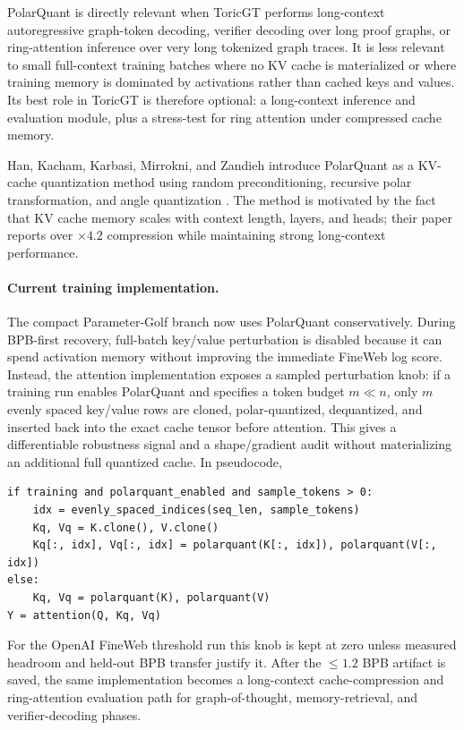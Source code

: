 \documentclass[11pt]{article}
\theoremstyle{definition}
\theoremstyle{plain}
\theoremstyle{remark}
\numberwithin{equation}{section}
\begin{document}
PolarQuant is directly relevant when ToricGT performs long-context autoregressive graph-token decoding, verifier decoding over long proof graphs, or ring-attention inference over very long tokenized graph traces.  It is less relevant to small full-context training batches where no KV cache is materialized or where training memory is dominated by activations rather than cached keys and values.  Its best role in ToricGT is therefore optional: a long-context inference and evaluation module, plus a stress-test for ring attention under compressed cache memory.

Han, Kacham, Karbasi, Mirrokni, and Zandieh introduce PolarQuant as a KV-cache quantization method using random preconditioning, recursive polar transformation, and angle quantization \cite{han2025polarquant}.  The method is motivated by the fact that KV cache memory scales with context length, layers, and heads; their paper reports over $\times 4.2$ compression while maintaining strong long-context performance.

\paragraph{Current training implementation.}
The compact Parameter-Golf branch now uses PolarQuant conservatively.  During BPB-first recovery, full-batch key/value perturbation is disabled because it can spend activation memory without improving the immediate FineWeb log score.  Instead, the attention implementation exposes a sampled perturbation knob: if a training run enables PolarQuant and specifies a token budget $m\ll n$, only $m$ evenly spaced key/value rows are cloned, polar-quantized, dequantized, and inserted back into the exact cache tensor before attention.  This gives a differentiable robustness signal and a shape/gradient audit without materializing an additional full quantized cache.  In pseudocode,
\begin{verbatim}
if training and polarquant_enabled and sample_tokens > 0:
    idx = evenly_spaced_indices(seq_len, sample_tokens)
    Kq, Vq = K.clone(), V.clone()
    Kq[:, idx], Vq[:, idx] = polarquant(K[:, idx]), polarquant(V[:, idx])
else:
    Kq, Vq = polarquant(K), polarquant(V)
Y = attention(Q, Kq, Vq)
\end{verbatim}
For the OpenAI FineWeb threshold run this knob is kept at zero unless measured headroom and held-out BPB transfer justify it.  After the $\le1.2$ BPB artifact is saved, the same implementation becomes a long-context cache-compression and ring-attention evaluation path for graph-of-thought, memory-retrieval, and verifier-decoding phases.
\end{document}
